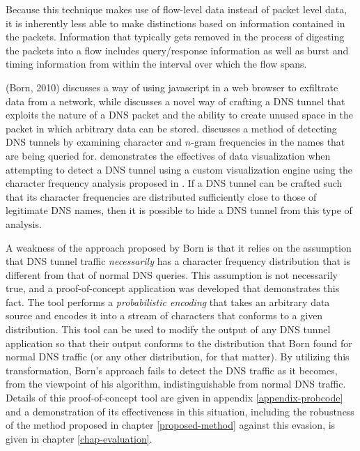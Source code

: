 \documentclass[12pt]{report}
\theoremstyle{remark}
\theoremstyle{definition}
\theoremstyle{definition}
\theoremstyle{definition}
\begin{document}
Because this technique makes use of flow-level data instead of packet level data, it
is inherently less able to make distinctions based on information contained in
the packets. Information that typically gets removed in the process of digesting
the packets into a flow includes query/response information as well as burst and
timing information from within the interval over which the flow spans.

\label{litreview-dns-cfa} (Born, 2010)\cite{Born2010.exfil} discusses a way of
using javascript in a web browser to exfiltrate data from a network, while
\cite{Born2010.psudp} discusses a novel way of crafting a DNS tunnel that
exploits the nature of a DNS packet and the ability to create unused space in
the packet in which arbitrary data can be stored. \cite{Born2010.cfa} discusses
a method of detecting DNS tunnels by examining character and $n$-gram
frequencies in the names that are being queried for. \cite{Born2010.ngviz}
demonstrates the effectives of data visualization when attempting to detect a
DNS tunnel using a custom visualization engine using the character frequency
analysis proposed in \cite{Born2010.ngviz}. If a DNS tunnel
can be crafted such that its character frequencies are distributed sufficiently
close to those of legitimate DNS names, then it is possible to hide a DNS tunnel
from this type of analysis.

A weakness of the approach proposed by Born is that it relies on the assumption
that DNS tunnel traffic \emph{necessarily} has a character frequency
distribution that is different from that of normal DNS queries. This assumption
is not necessarily true, and a proof-of-concept application was developed that
demonstrates this fact. The tool performs a \emph{probabilistic encoding} that
takes an arbitrary data source and encodes it into a stream of characters that
conforms to a given distribution. This tool can be used to modify the output of
any DNS tunnel application so that their output conforms to the distribution
that Born found for normal DNS traffic (or any other distribution, for that
matter). By utilizing this transformation, Born's approach fails to detect the
DNS traffic as it becomes, from the viewpoint of his algorithm,
indistinguishable from normal DNS traffic. Details of this proof-of-concept tool
are given in appendix \ref{appendix-probcode} and a demonstration of its
effectiveness in this situation, including the robustness of the method proposed
in chapter \ref{proposed-method} against this evasion, is given in chapter
\ref{chap-evaluation}.
\end{document}
